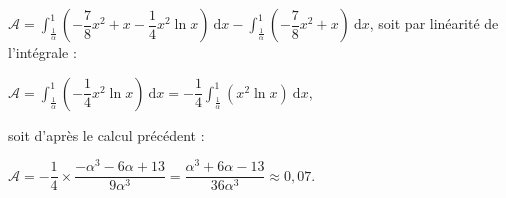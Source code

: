 \begin{enumerate}
$\mathcal{A} = \displaystyle\int_\frac{1}{\alpha}^1 \left(- \dfrac78 x^2 + x - \dfrac14 x^2 \ln x\right)\:\text{d}x - \displaystyle\int_\frac{1}{\alpha}^1 \left(- \dfrac78 x^2 + x \right)\:\text{d}x$, soit par linéarité de l'intégrale :

$\mathcal{A} = \displaystyle\int_\frac{1}{\alpha}^1 \left( - \dfrac14 x^2 \ln x\right)\:\text{d}x = - \dfrac14 \displaystyle\int_\frac{1}{\alpha}^1 \left(x^2 \ln x\right)\:\text{d}x$,

soit d'après le calcul précédent :

$\mathcal{A} = - \dfrac14  \times \dfrac{- \alpha^3 - 6\alpha + 13}{9\alpha^3} = \dfrac{\alpha^3 + 6\alpha - 13}{36\alpha^3} \approx 0,07$.
\end{enumerate}
